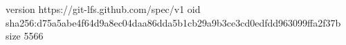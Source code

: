 version https://git-lfs.github.com/spec/v1
oid sha256:d75a5abe4f64d9a8ec04daa86dda5b1cb29a9b3ce3cd0edfdd963099ffa2f37b
size 5566
